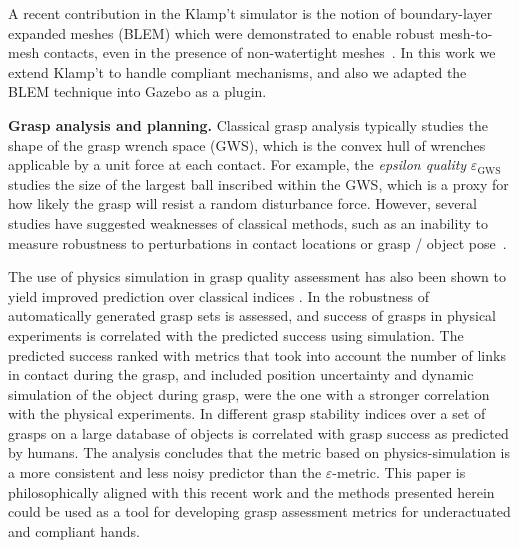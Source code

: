  A recent contribution in the Klamp't simulator is the notion of boundary-layer expanded meshes (BLEM) which were demonstrated to enable robust mesh-to-mesh contacts, even in the presence of non-watertight meshes~\cite{Hauser13BLEM}. In this work we extend Klamp't to handle compliant mechanisms, and also we adapted the BLEM technique into Gazebo as a plugin.


{\bf Grasp analysis and planning.}  
Classical grasp analysis typically studies the shape of the grasp wrench space (GWS), which is the convex hull of wrenches applicable by a unit force at each contact. For example, the {\emph{epsilon quality} $\varepsilon_{\text{GWS}}$} \cite{Ferrari92, Pokorny13c} studies the size of the largest ball inscribed within the GWS, which is a proxy for how likely the grasp will resist a random  disturbance force. 
However, several studies have suggested weaknesses of classical methods, such as an inability to measure robustness to perturbations in contact locations or grasp / object pose~\cite{Weisz12}. 

The use of physics simulation in grasp quality assessment has also been shown to yield improved prediction over classical indices \cite{Kappler15,JunggonKim13}.  In \cite{JunggonKim13} the robustness of automatically generated grasp sets is assessed, and success of grasps in physical experiments is correlated with the predicted success using simulation. The predicted success ranked with metrics that took into account the number of links in contact during the grasp, and included position uncertainty and dynamic simulation of the object during grasp, were the one with a stronger correlation with the physical experiments.
In \cite{Kappler15} different grasp stability indices over a set of grasps on a large database of objects is correlated with grasp success as predicted by humans. The analysis concludes that the metric based on  physics-simulation is a more consistent and less noisy predictor than the $\varepsilon$-metric.
This paper is philosophically aligned with this recent work and the methods presented herein could be used as a tool for developing grasp assessment metrics for underactuated and compliant hands.

